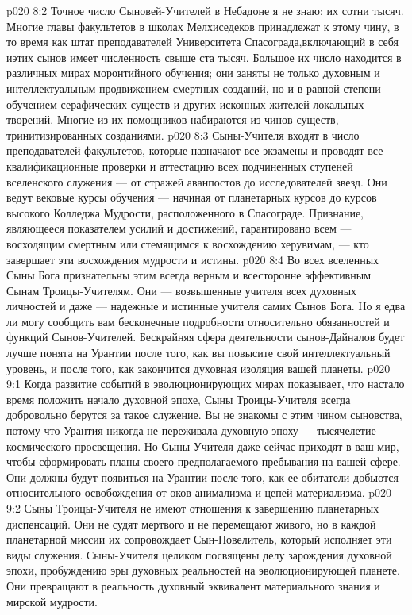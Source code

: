 \vs p020 8:2 Точное число Сыновей\hyp{}Учителей в Небадоне я не знаю; их сотни тысяч. Многие главы факультетов в школах Мелхиседеков принадлежат к этому чину, в то время как штат преподавателей Университета Спасограда,включающий в себя иэтих сынов имеет численность свыше ста тысяч. Большое их число находится в различных мирах моронтийного обучения; они заняты не только духовным и интеллектуальным продвижением смертных созданий, но и в равной степени обучением серафических существ и других исконных жителей локальных творений. Многие из их помощников набираются из чинов существ, тринитизированных созданиями.
\vs p020 8:3 Сыны\hyp{}Учителя входят в число преподавателей факультетов, которые назначают все экзамены и проводят все квалификационные проверки и аттестацию всех подчиненных ступеней вселенского служения --- от стражей аванпостов до исследователей звезд. Они ведут вековые курсы обучения --- начиная от планетарных курсов до курсов высокого Колледжа Мудрости, расположенного в Спасограде. Признание, являющееся показателем усилий и достижений, гарантировано всем --- восходящим смертным или стемящимся к восхождению херувимам, --- кто завершает эти восхождения мудрости и истины.
\vs p020 8:4 Во всех вселенных Сыны Бога признательны этим всегда верным и всесторонне эффективным Сынам Троицы\hyp{}Учителям. Они --- возвышенные учителя всех духовных личностей и даже --- надежные и истинные учителя самих Сынов Бога. Но я едва ли могу сообщить вам бесконечные подробности относительно обязанностей и функций Сынов\hyp{}Учителей. Бескрайняя сфера деятельности сынов\hyp{}Дайналов будет лучше понята на Урантии после того, как вы повысите свой интеллектуальный уровень, и после того, как закончится духовная изоляция вашей планеты.
\vs p020 9:1 Когда развитие событий в эволюционирующих мирах показывает, что настало время положить начало духовной эпохе, Сыны Троицы\hyp{}Учителя всегда добровольно берутся за такое служение. Вы не знакомы с этим чином сыновства, потому что Урантия никогда не переживала духовную эпоху --- тысячелетие космического просвещения. Но Сыны\hyp{}Учителя даже сейчас приходят в ваш мир, чтобы сформировать планы своего предполагаемого пребывания на вашей сфере. Они должны будут появиться на Урантии после того, как ее обитатели добьются относительного освобождения от оков анимализма и цепей материализма.
\vs p020 9:2 Сыны Троицы\hyp{}Учителя не имеют отношения к завершению планетарных диспенсаций. Они не судят мертвого и не перемещают живого, но в каждой планетарной миссии их сопровождает Сын\hyp{}Повелитель, который исполняет эти виды служения. Сыны\hyp{}Учителя целиком посвящены делу зарождения духовной эпохи, пробуждению эры духовных реальностей на эволюционирующей планете. Они превращают в реальность духовный эквивалент материального знания и мирской мудрости.
